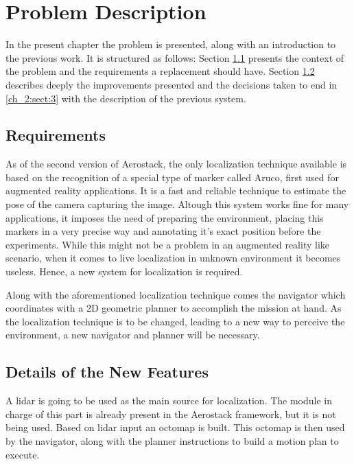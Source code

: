 \chapter{Problem Description}

  In the present chapter the problem is presented, along with an introduction to the previous work. It is structured as follows: Section \ref{ch_2:sect:1} presents the context of the problem and the requirements a replacement should have. Section \ref{ch_2:sect:2} describes deeply the improvements presented and the decisions taken to end in \ref{ch_2:sect:3} with the description of the previous system.

  \section{Requirements} \label{ch_2:sect:1}

    As of the second version of Aerostack, the only localization technique available is based on the recognition of a special type of marker called Aruco, first used for augmented reality applications. It is a fast and reliable technique to estimate the pose of the camera capturing the image. Altough this system works fine for many applications, it imposes the need of preparing the environment, placing this markers in a very precise way and annotating it's exact position before the experiments. While this might not be a problem in an augmented reality like scenario, when it comes to live localization in unknown environment it becomes useless. Hence, a new system for localization is required.

    Along with the aforementioned localization technique comes the navigator which coordinates with a 2D geometric planner to accomplish the mission at hand. As the localization technique is to be changed, leading to a new way to perceive the environment, a new navigator and planner will be necessary. 

  \section{Details of the New Features} \label{ch_2:sect:2}

    A lidar is going to be used as the main source for localization. The module in charge of this part is already present in the Aerostack framework, but it is not being used. Based on lidar input an octomap is built. This octomap is then used by the navigator, along with the planner instructions to build a motion plan to execute.

